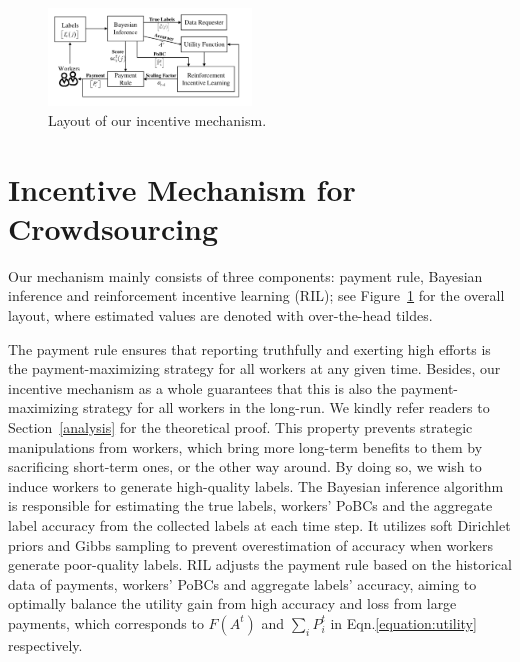 \begin{figure}[t]
 	\centering
	\includegraphics[width=0.48\textwidth]{image/Architecture}
	\vspace*{-8mm}
    \caption{\label{figure:layout} Layout of our incentive mechanism.}
\end{figure}
\section{Incentive Mechanism for Crowdsourcing}
Our mechanism mainly consists of three components: payment rule, Bayesian inference and reinforcement incentive learning (RIL); see Figure~\ref{figure:layout} for the overall layout, where estimated values are denoted with over-the-head tildes. 

 The payment rule ensures that reporting truthfully and exerting high efforts is the payment-maximizing strategy for all workers at any given time. Besides, our incentive mechanism as a whole guarantees that this is also the payment-maximizing strategy for all workers in the long-run. We kindly refer readers to Section~\ref{analysis} for the theoretical proof. This property prevents strategic manipulations from workers, which bring more long-term benefits to them by sacrificing short-term ones, or the other way around. 
By doing so, we wish to induce workers to generate high-quality labels. %
The Bayesian inference algorithm is responsible for estimating the true labels, workers' PoBCs and the aggregate label accuracy from the collected labels at each time step. It utilizes soft Dirichlet priors and Gibbs sampling to prevent overestimation of accuracy when workers generate poor-quality labels. RIL adjusts the payment rule based on the historical data of payments, workers' PoBCs and aggregate labels' accuracy, aiming to optimally balance the utility gain from high accuracy and loss from large payments, which corresponds to $F(A^t)$ and $\sum_{i}P_i^t$ in Eqn.\ref{equation:utility} respectively. %

